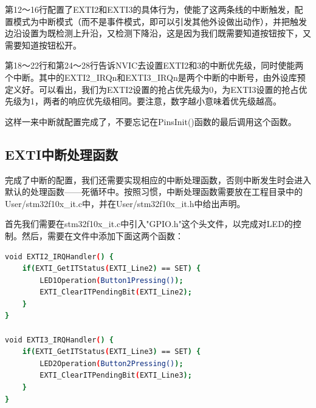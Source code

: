 		\par 
		第12～16行配置了EXTI2和EXTI3的具体行为，使能了这两条线的中断触发，配置模式为中断模式（而不是事件模式，即可以引发其他外设做出动作），并把触发边沿设置为既检测上升沿，又检测下降沿，这是因为我们既需要知道按钮按下，又需要知道按钮松开。
		\par 
		第18～22行和第24～28行告诉NVIC去设置EXTI2和3的中断优先级，同时使能两个中断。其中的EXTI2\_IRQn和EXTI3\_IRQn是两个中断的中断号，由外设库预定义好。可以看出，我们为EXTI2设置的抢占优先级为0，为EXTI3设置的抢占优先级为1，两者的响应优先级相同。要注意，数字越小意味着优先级越高。
		\par 
		这样一来中断就配置完成了，不要忘记在PinsInit()函数的最后调用这个函数。
		
	\subsection{EXTI中断处理函数}
		完成了中断的配置，我们还需要实现相应的中断处理函数，否则中断发生时会进入默认的处理函数——死循环中。按照习惯，中断处理函数需要放在工程目录中的User/stm32f10x\_it.c中，并在User/stm32f10x\_it.h中给出声明。
		\par 
		首先我们需要在stm32f10x\_it.c中引入"GPIO.h"这个头文件，以完成对LED的控制。然后，需要在文件中添加下面这两个函数：
		\par 
		\begin{lstlisting}[language=bash, style=customStyleC, caption=中断处理函数]
void EXTI2_IRQHandler() {
	if(EXTI_GetITStatus(EXTI_Line2) == SET) {
		LED1Operation(Button1Pressing());
		EXTI_ClearITPendingBit(EXTI_Line2);
	}
}

void EXTI3_IRQHandler() {
	if(EXTI_GetITStatus(EXTI_Line3) == SET) {
		LED2Operation(Button2Pressing());
		EXTI_ClearITPendingBit(EXTI_Line3);
	}
}
		\end{lstlisting}
		\par 
















